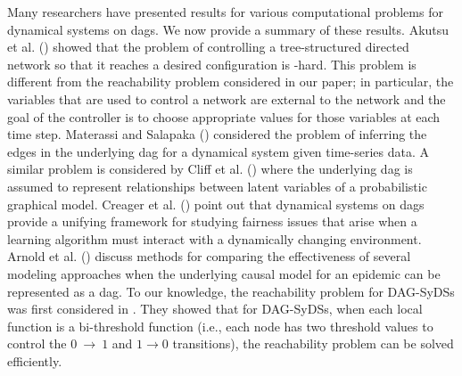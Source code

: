 Many researchers have presented results for various computational
problems for dynamical systems on dags.
We now provide a summary of these results.
Akutsu et al. (\citeyear{Akutsu-etal-2007}) showed that the problem
of controlling a tree-structured directed network so that it
reaches a desired configuration is \cnp-hard.
This problem is different from the reachability problem
considered in our paper; in particular, the variables that are used to
control a network are external to the network and the goal of the controller
is to choose appropriate values for those variables at each time step.
Materassi and Salapaka (\citeyear{Materassi-etal-2013}) considered the
problem of inferring the edges in the underlying dag for a dynamical
system given time-series data.
A similar problem is considered by 
Cliff et al. (\citeyear{Cliff-etal-2016}) where the underlying
dag is assumed to represent relationships between latent 
variables of a probabilistic graphical model.
Creager et al. (\citeyear{Creager-etal-2020}) point out that dynamical systems
on dags provide a unifying framework for studying fairness issues that
arise when a learning algorithm must interact with a dynamically
changing environment.
Arnold et al. (\citeyear{Arnold-etal-2019}) discuss methods
for comparing the effectiveness of several modeling approaches 
when the underlying causal model
for an epidemic can be represented as a dag.
To our knowledge, the reachability problem for DAG-SyDSs 
was first considered in \cite{KKM+2013}. 
They showed that for DAG-SyDSs, when each local function is 
a bi-threshold function (i.e., each node has two threshold
values to control the $0 ~\rightarrow~  1$ and $1 \rightarrow 0$
transitions), the reachability problem can be solved efficiently.

